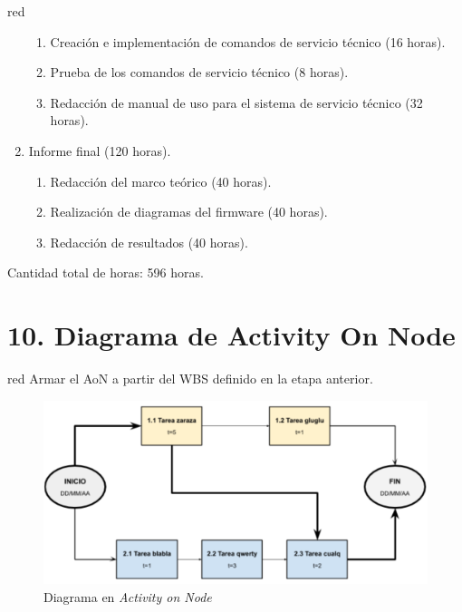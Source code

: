\documentclass[
11pt, %
codirector, %
]{charter}
\begin{document}
\begin{consigna}{red}
\begin{enumerate}
\begin{enumerate}
			      \item Creación e implementación de comandos de servicio técnico (16 horas).
			      \item Prueba de los comandos de servicio técnico (8 horas).
			      \item Redacción de manual de uso para el sistema de servicio técnico (32 horas).
		      \end{enumerate}
		\item Informe final (120 horas).
		      \begin{enumerate}
			      \item Redacción del marco teórico (40 horas).
			      \item Realización de diagramas del firmware (40 horas).
			      \item Redacción de resultados (40 horas).
		      \end{enumerate}
	\end{enumerate}


	Cantidad total de horas: 596 horas.


\end{consigna}

\section{10. Diagrama de Activity On Node}
\label{sec:AoN}

\begin{consigna}{red}
	Armar el AoN a partir del WBS definido en la etapa anterior.



\end{consigna}

\begin{figure}[htpb]
	\centering
	\includegraphics[width=.8\textwidth]{./Figuras/AoN.png}
	\caption{Diagrama en \textit{Activity on Node}}
	\label{fig:AoN}
\end{figure}
\end{document}
